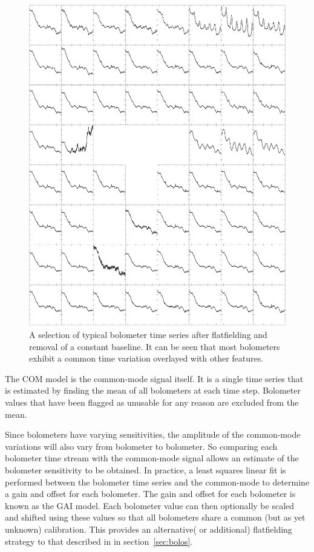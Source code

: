 \documentclass[useAMS,usenatbib,nofootinbib]{mn2e}
\begin{document}
\begin{figure}
\centering
\includegraphics[width=\linewidth]{com.pdf}
\caption{A selection of typical bolometer time series after flatfielding
and removal of a constant baseline. It can be seen that most bolometers
exhibit a common time variation overlayed with other features.}
\label{fig:com}
\end{figure}

The COM model is the common-mode signal itself. It is a single time
series that is estimated by finding the mean of all bolometers at each
time step. Bolometer values that have been flagged as unusable for any
reason are excluded from the mean.

Since bolometers have varying sensitivities, the amplitude of the
common-mode variations will also vary from bolometer to bolometer. So
comparing each bolometer time stream with the common-mode signal allows
an estimate of the bolometer sensitivity to be obtained. In practice, a
least squares linear fit is performed between the bolometer time series
and the common-mode to determine a gain and offset for each bolometer.
The gain and offset for each bolometer is known as the GAI model. Each
bolometer value can then optionally be scaled and shifted using these
values so that all bolometers share a common (but as yet unknown)
calibration. This provides an alternative( or additional) flatfielding
strategy to that described in in section~\ref{sec:bolos}.
\end{document}
